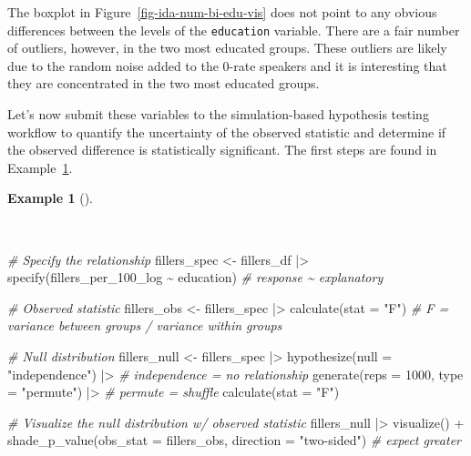 \documentclass[
  letterpaper,
  DIV=11,
  numbers=noendperiod]{scrreprt}
\newenvironment{Shaded}{\begin{snugshade}}{\end{snugshade}}
\newcommand{\AttributeTok}[1]{\textcolor[rgb]{0.00,0.00,0.00}{#1}}
\newcommand{\CommentTok}[1]{\textcolor[rgb]{0.00,0.00,0.00}{\textit{#1}}}
\newcommand{\DecValTok}[1]{\textcolor[rgb]{0.00,0.00,0.00}{#1}}
\newcommand{\FunctionTok}[1]{\textcolor[rgb]{0.00,0.00,0.00}{#1}}
\newcommand{\NormalTok}[1]{\textcolor[rgb]{0.00,0.00,0.00}{#1}}
\newcommand{\OtherTok}[1]{\textcolor[rgb]{0.00,0.00,0.00}{#1}}
\newcommand{\SpecialCharTok}[1]{\textcolor[rgb]{0.00,0.00,0.00}{#1}}
\newcommand{\StringTok}[1]{\textcolor[rgb]{0.00,0.00,0.00}{#1}}
\theoremstyle{definition}
\newtheorem{example}{Example}[chapter]
\theoremstyle{remark}
\begin{document}
The boxplot in Figure~\ref{fig-ida-num-bi-edu-vis} does not point to any
obvious differences between the levels of the \texttt{education}
variable. There are a fair number of outliers, however, in the two most
educated groups. These outliers are likely due to the random noise added
to the 0-rate speakers and it is interesting that they are concentrated
in the two most educated groups.

Let's now submit these variables to the simulation-based hypothesis
testing workflow to quantify the uncertainty of the observed statistic
and determine if the observed difference is statistically significant.
The first steps are found in Example~\ref{exm-ida-num-bi-edu-null}.

\begin{example}[]\protect\hypertarget{exm-ida-num-bi-edu-null}{}\label{exm-ida-num-bi-edu-null}

~

\begin{Shaded}
\begin{Highlighting}[]
\CommentTok{\# Specify the relationship}
\NormalTok{fillers\_spec }\OtherTok{\textless{}{-}}
\NormalTok{  fillers\_df }\SpecialCharTok{|\textgreater{}}
  \FunctionTok{specify}\NormalTok{(fillers\_per\_100\_log }\SpecialCharTok{\textasciitilde{}}\NormalTok{ education) }\CommentTok{\# response \textasciitilde{} explanatory}

\CommentTok{\# Observed statistic}
\NormalTok{fillers\_obs }\OtherTok{\textless{}{-}}
\NormalTok{  fillers\_spec }\SpecialCharTok{|\textgreater{}}
  \FunctionTok{calculate}\NormalTok{(}\AttributeTok{stat =} \StringTok{"F"}\NormalTok{) }\CommentTok{\# F = variance between groups / variance within groups}

\CommentTok{\# Null distribution}
\NormalTok{fillers\_null }\OtherTok{\textless{}{-}}
\NormalTok{  fillers\_spec }\SpecialCharTok{|\textgreater{}}
  \FunctionTok{hypothesize}\NormalTok{(}\AttributeTok{null =} \StringTok{"independence"}\NormalTok{) }\SpecialCharTok{|\textgreater{}} \CommentTok{\# independence = no relationship}
  \FunctionTok{generate}\NormalTok{(}\AttributeTok{reps =} \DecValTok{1000}\NormalTok{, }\AttributeTok{type =} \StringTok{"permute"}\NormalTok{) }\SpecialCharTok{|\textgreater{}} \CommentTok{\# permute = shuffle}
  \FunctionTok{calculate}\NormalTok{(}\AttributeTok{stat =} \StringTok{"F"}\NormalTok{)}

\CommentTok{\# Visualize the null distribution w/ observed statistic}
\NormalTok{fillers\_null }\SpecialCharTok{|\textgreater{}}
  \FunctionTok{visualize}\NormalTok{() }\SpecialCharTok{+}
  \FunctionTok{shade\_p\_value}\NormalTok{(}\AttributeTok{obs\_stat =}\NormalTok{ fillers\_obs, }\AttributeTok{direction =} \StringTok{"two{-}sided"}\NormalTok{) }\CommentTok{\# expect greater}


\end{Highlighting}
\end{Shaded}
\end{example}
\end{document}
